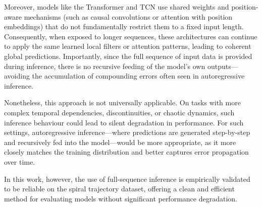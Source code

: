Moreover, models like the Transformer and TCN use shared weights and position-aware mechanisms (such as causal convolutions or attention with position embeddings) that do not fundamentally restrict them to a fixed input length. Consequently, when exposed to longer sequences, these architectures can continue to apply the same learned local filters or attention patterns, leading to coherent global predictions. Importantly, since the full sequence of input data is provided during inference, there is no recursive feeding of the model's own outputs---avoiding the accumulation of compounding errors often seen in autoregressive inference.

Nonetheless, this approach is not universally applicable. On tasks with more complex temporal dependencies, discontinuities, or chaotic dynamics, such inference behaviour could lead to silent degradation in performance. For such settings, autoregressive inference---where predictions are generated step-by-step and recursively fed into the model---would be more appropriate, as it more closely matches the training distribution and better captures error propagation over time.

In this work, however, the use of full-sequence inference is empirically validated to be reliable on the spiral trajectory dataset, offering a clean and efficient method for evaluating models without significant performance degradation.
